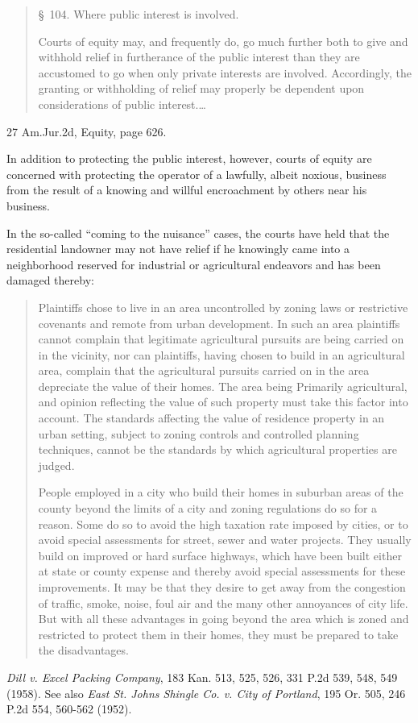 \begin{quote}
\S~104. Where public interest is involved.

Courts of equity may, and frequently do, go much further both to give and
withhold relief in furtherance of the public interest than they are accustomed
to go when only private interests are involved. Accordingly, the granting or
withholding of relief may properly be dependent upon considerations of public
interest.\ldots
\end{quote}
27 Am.Jur.2d, Equity, page 626.

In addition to protecting the public interest, however, courts of equity are
concerned with protecting the operator of a lawfully, albeit noxious, business
from the result of a knowing and willful encroachment by others near his
business.

In the so-called ``coming to the nuisance'' cases, the courts have held that the
residential landowner may not have relief if he knowingly came into a
neighborhood reserved for industrial or agricultural endeavors and has been
damaged thereby:
\begin{quotation}
Plaintiffs chose to live in an area uncontrolled by zoning laws or
restrictive covenants and remote from urban development. In such an area
plaintiffs cannot complain that legitimate agricultural pursuits are being
carried on in the vicinity, nor can plaintiffs, having chosen to build in an
agricultural area, complain that the agricultural pursuits carried on in the
area depreciate the value of their homes. The area being Primarily agricultural,
and opinion reflecting the value of such property must take this factor into
account. The standards affecting the value of residence property in an urban
setting, subject to zoning controls and controlled planning techniques, cannot
be the standards by which agricultural properties are judged.

People employed in a city who build their homes in suburban areas of the
county beyond the limits of a city and zoning regulations do so for a reason.
Some do so to avoid the high taxation rate imposed by cities, or to avoid
special assessments for street, sewer and water projects. They usually build on
improved or hard surface highways, which have been built either at state or
county expense and thereby avoid special assessments for these improvements. It
may be that they desire to get away from the congestion of traffic, smoke,
noise, foul air and the many other annoyances of city life. But with all these
advantages in going beyond the area which is zoned and restricted to protect
them in their homes, they must be prepared to take the disadvantages.
\end{quotation}
\emph{Dill v. Excel Packing Company}, 183 Kan. 513, 525, 526, 331 P.2d 539, 548,
549 (1958). See also \emph{East St. Johns Shingle Co. v. City of Portland}, 195
Or. 505, 246 P.2d 554, 560-562 (1952).

